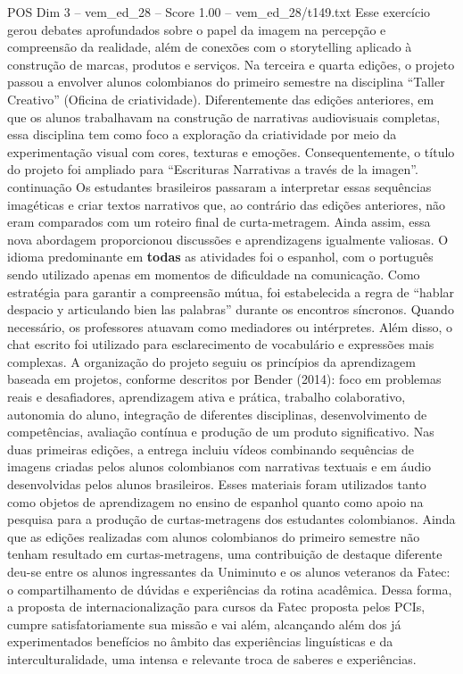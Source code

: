 \begin{textsample}{POS Dim 3 – vem\_ed\_28 – Score 1.00 – vem\_ed\_28/t149.txt}
Esse exercício gerou debates aprofundados sobre o papel da imagem na percepção e compreensão da realidade, além de conexões com o storytelling aplicado à construção de marcas, produtos e serviços.
Na terceira e quarta edições, o projeto passou a envolver alunos colombianos do primeiro semestre na disciplina “Taller Creativo” (Oficina de criatividade).
Diferentemente das edições anteriores, em que os alunos trabalhavam na construção de narrativas audiovisuais completas, essa disciplina tem como foco a exploração da criatividade por meio da experimentação visual com cores, texturas e emoções.
Consequentemente, o título do projeto foi ampliado para “Escrituras Narrativas a través de la imagen”. continuação Os estudantes brasileiros passaram a interpretar essas sequências imagéticas e criar textos narrativos que, ao contrário das edições anteriores, não eram comparados com um roteiro final de curta-metragem.
Ainda assim, essa nova abordagem proporcionou discussões e aprendizagens igualmente valiosas.
O idioma predominante em \textbf{todas} as atividades foi o espanhol, com o português sendo utilizado apenas em momentos de dificuldade na comunicação.
Como estratégia para garantir a compreensão mútua, foi estabelecida a regra de “hablar despacio y articulando bien las palabras” durante os encontros síncronos.
Quando necessário, os professores atuavam como mediadores ou intérpretes.
Além disso, o chat escrito foi utilizado para esclarecimento de vocabulário e expressões mais complexas.
A organização do projeto seguiu os princípios da aprendizagem baseada em projetos, conforme descritos por Bender (2014): foco em problemas reais e desafiadores, aprendizagem ativa e prática, trabalho colaborativo, autonomia do aluno, integração de diferentes disciplinas, desenvolvimento de competências, avaliação contínua e produção de um produto significativo.
Nas duas primeiras edições, a entrega incluiu vídeos combinando sequências de imagens criadas pelos alunos colombianos com narrativas textuais e em áudio desenvolvidas pelos alunos brasileiros.
Esses materiais foram utilizados tanto como objetos de aprendizagem no ensino de espanhol quanto como apoio na pesquisa para a produção de curtas-metragens dos estudantes colombianos.
Ainda que as edições realizadas com alunos colombianos do primeiro semestre não tenham resultado em curtas-metragens, uma contribuição de destaque diferente deu-se entre os alunos ingressantes da Uniminuto e os alunos veteranos da Fatec: o compartilhamento de dúvidas e experiências da rotina acadêmica.
Dessa forma, a proposta de internacionalização para cursos da Fatec proposta pelos PCIs, cumpre satisfatoriamente sua missão e vai além, alcançando além dos já experimentados benefícios no âmbito das experiências linguísticas e da interculturalidade, uma intensa e relevante troca de saberes e experiências.

\end{textsample}
